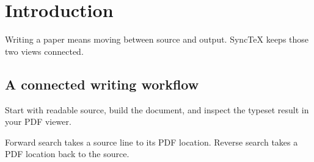\documentclass[12pt]{article}
\begin{document}
\section{Introduction}
Writing a paper means moving between source and output.
SyncTeX keeps those two views connected.

\subsection{A connected writing workflow}
Start with readable source, build the document, and inspect
the typeset result in your PDF viewer.

Forward search takes a source line to its PDF location.
Reverse search takes a PDF location back to the source.

\newpage

\newpage

\end{document}
